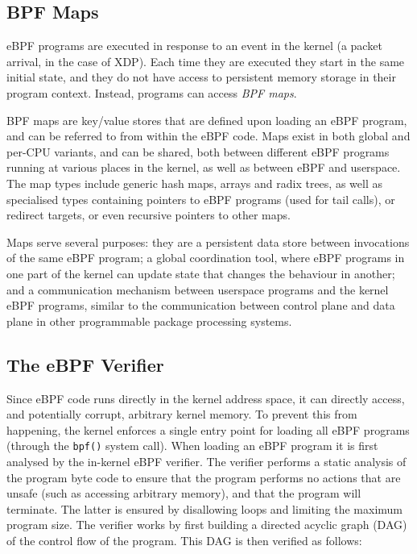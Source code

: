 \documentclass[sigconf]{acmart}
\begin{document}
\subsection{BPF Maps}
\label{sec:bpf-maps}
eBPF programs are executed in response to an event in the kernel (a packet
arrival, in the case of XDP). Each time they are executed they start in the same
initial state, and they do not have access to persistent memory storage in their
program context. Instead, programs can access \emph{BPF maps}.

BPF maps are key/value stores that are defined upon loading an eBPF program, and
can be referred to from within the eBPF code. Maps exist in both global and
per-CPU variants, and can be shared, both between different eBPF programs
running at various places in the kernel, as well as between eBPF and userspace.
The map types include generic hash maps, arrays and radix trees, as well as
specialised types containing pointers to eBPF programs (used for tail calls), or
redirect targets, or even recursive pointers to other maps.

Maps serve several purposes: they are a persistent data store between
invocations of the same eBPF program; a global coordination tool, where eBPF
programs in one part of the kernel can update state that changes the behaviour
in another; and a communication mechanism between userspace programs and the
kernel eBPF programs, similar to the communication between control plane and
data plane in other programmable package processing systems.

\subsection{The eBPF Verifier}
\label{sec:bpf-verifier}
Since eBPF code runs directly in the kernel address space, it can directly
access, and potentially corrupt, arbitrary kernel memory. To prevent this from
happening, the kernel enforces a single entry point for loading all eBPF
programs (through the \texttt{bpf()} system call). When loading an eBPF program
it is first analysed by the in-kernel eBPF verifier. The verifier performs a
static analysis of the program byte code to ensure that the program performs no
actions that are unsafe (such as accessing arbitrary memory), and that the
program will terminate. The latter is ensured by disallowing loops and limiting
the maximum program size. The verifier works by first building a directed
acyclic graph (DAG) of the control flow of the program. This DAG is then
verified as follows:
\end{document}
